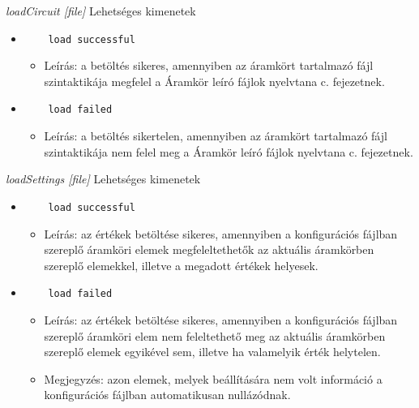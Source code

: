 \textit{loadCircuit [file]}\newline
Lehetséges kimenetek
\begin{itemize}
	\item
	\begin{verbatim}
	load successful
	\end{verbatim}
	\begin{itemize}
		\item Leírás: a betöltés sikeres, amennyiben az áramkört tartalmazó fájl szintaktikája megfelel a Áramkör leíró fájlok nyelvtana c. fejezetnek.
	\end{itemize}
	\item 
	\begin{verbatim}
	load failed
	\end{verbatim}
	\begin{itemize}
		\item Leírás: a betöltés sikertelen, amennyiben az áramkört tartalmazó fájl szintaktikája nem felel meg a Áramkör leíró fájlok nyelvtana c. fejezetnek.
	\end{itemize}
\end{itemize}

\textit{loadSettings [file]}\newline
Lehetséges kimenetek
\begin{itemize}
	\item
	\begin{verbatim}
	load successful
	\end{verbatim}
	\begin{itemize}
		\item Leírás: az értékek betöltése sikeres, amennyiben a konfigurációs fájlban szereplő áramköri elemek megfeleltethetők az aktuális áramkörben szereplő elemekkel, illetve a megadott értékek helyesek.
	\end{itemize}
	\item
	\begin{verbatim}
	load failed
	\end{verbatim}
	\begin{itemize}
		\item Leírás: az értékek betöltése sikeres, amennyiben a konfigurációs fájlban szereplő áramköri elem nem feleltethető meg az aktuális áramkörben szereplő elemek egyikével sem, illetve ha valamelyik érték helytelen.
		\item Megjegyzés: azon elemek, melyek beállítására nem volt információ a konfigurációs fájlban automatikusan nullázódnak.
	\end{itemize}
\end{itemize}

